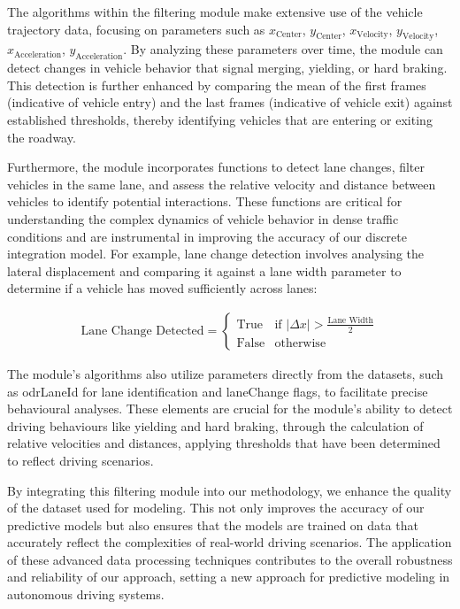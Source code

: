 The algorithms within the filtering module make extensive use of the vehicle trajectory data, focusing on parameters such as $x_{\text{Center}}$, $y_{\text{Center}}$, $x_{\text{Velocity}}$, $y_{\text{Velocity}}$, $x_{\text{Acceleration}}$, 
$y_{\text{Acceleration}}$. By analyzing these parameters over time, the module can detect changes in vehicle behavior that signal merging, yielding, or hard braking. This detection is further enhanced by comparing the mean of the first frames (indicative of vehicle entry) and the last frames (indicative of vehicle exit) against established thresholds, thereby identifying vehicles that are entering or exiting the roadway.

Furthermore, the module incorporates functions to detect lane changes, filter vehicles in the same lane, and assess the relative velocity and distance between vehicles to identify potential interactions. These functions are critical for understanding the complex dynamics of vehicle behavior in dense traffic conditions and are instrumental in improving the accuracy of our discrete integration model. For example, lane change detection involves analysing the lateral displacement and comparing it against a lane width parameter to determine if a vehicle has moved sufficiently across lanes:

\begin{align} 
\text{Lane Change Detected} = \left\{
\begin{array}{ll}
\text{True} & \text{if } \left| \Delta x \right| > \frac{\text{Lane Width}}{2} \\
\text{False} & \text{otherwise}
\end{array}
\right.
\end{align}

The module's algorithms also utilize parameters directly from the datasets, such as odrLaneId for lane identification and laneChange flags, to facilitate precise behavioural analyses. These elements are crucial for the module's ability to detect driving behaviours like yielding and hard braking, through the calculation of relative velocities and distances, applying thresholds that have been determined to reflect driving scenarios.

By integrating this filtering module into our methodology, we enhance the quality of the dataset used for modeling. This not only improves the accuracy of our predictive models but also ensures that the models are trained on data that accurately reflect the complexities of real-world driving scenarios. The application of these advanced data processing techniques contributes to the overall robustness and reliability of our approach, setting a new approach for predictive modeling in autonomous driving systems.

